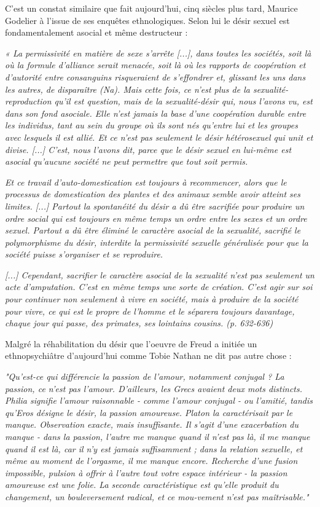  C'est un constat similaire que fait aujourd'hui, cinq siècles plus tard, Maurice Godelier à l'issue de ses enquêtes ethnologiques. Selon lui le désir sexuel est fondamentalement asocial et même destructeur : 
 \begin{displayquote}
 \emph{« La permissivité en matière de sexe s'arrête [...], dans toutes les sociétés, soit là où la formule d'alliance serait menacée, soit là où les rapports de coopération et d'autorité entre consanguins risqueraient de s'effondrer et, glissant les uns dans les autres, de disparaître (Na). Mais cette fois, ce n'est plus de la sexualité-reproduction qu'il est question, mais de la sexualité-désir qui, nous l'avons vu, est dans son fond asociale. Elle n'est jamais la base d'une coopération durable entre les individus, tant au sein du groupe où ils sont nés qu'entre lui et les groupes avec lesquels il est allié. Et ce n'est pas seulement le désir hétérosexuel qui unit et divise. [...] C'est, nous l'avons dit, parce que le désir sexuel en lui-même est asocial qu'aucune société ne peut permettre que tout soit permis.} 
 
 \emph{Et ce travail d'auto-domestication est toujours à recommencer, alors que le processus de domestication des plantes et des animaux semble avoir atteint ses limites. [...] Partout la spontanéité du désir a dû être sacrifiée pour produire un ordre social qui est toujours en même temps un ordre entre les sexes et un ordre sexuel. Partout a dû être éliminé le caractère asocial de la sexualité, sacrifié le polymorphisme du désir, interdite la permissivité sexuelle généralisée pour que la société puisse s'organiser et se reproduire.}
 
\emph{[...] Cependant, sacrifier le caractère asocial de la sexualité n'est pas seulement un acte d'amputation.  C'est en même temps une sorte de création. C'est agir sur soi pour continuer non seulement à vivre en société, mais à produire de la société pour vivre, ce qui est le propre de l'homme et le séparera toujours davantage, chaque jour qui passe, des primates, ses lointains cousins. (p. 632-636)}
\end{displayquote}
Malgré la réhabilitation du désir que l’oeuvre de Freud a initiée un ethnopsychiâtre d'aujourd'hui comme Tobie Nathan  ne dit pas autre chose : 
\begin{displayquote}
\emph{"Qu'est-ce qui différencie la passion de l'amour, notamment conjugal ? La passion, ce n'est pas l'amour. D'ailleurs, les Grecs avaient deux mots distincts. Philia signifie l'amour raisonnable - comme l'amour conjugal - ou l'amitié, tandis qu'Eros désigne le désir, la passion amoureuse. Platon la caractérisait par le manque. Observation exacte, mais insuffisante. Il s'agit d'une exacerbation du manque - dans la passion, l'autre me manque quand il n'est pas là, il me manque quand il est là, car il n'y est jamais suffisamment ; dans la relation sexuelle, et même au moment de l'orgasme, il me manque encore. Recherche d'une fusion impossible, pulsion à offrir à l'autre tout votre espace intérieur - la passion amoureuse est une folie. La seconde caractéristique est qu'elle produit du changement, un bouleversement radical, et ce mou-vement n'est pas maîtrisable."}
\end{displayquote}
